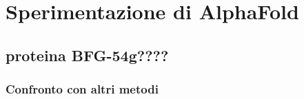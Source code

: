 \chapter{Sperimentazione di AlphaFold}
\section{proteina BFG-54g????}
\subsection{Confronto con altri metodi}

\clearpage